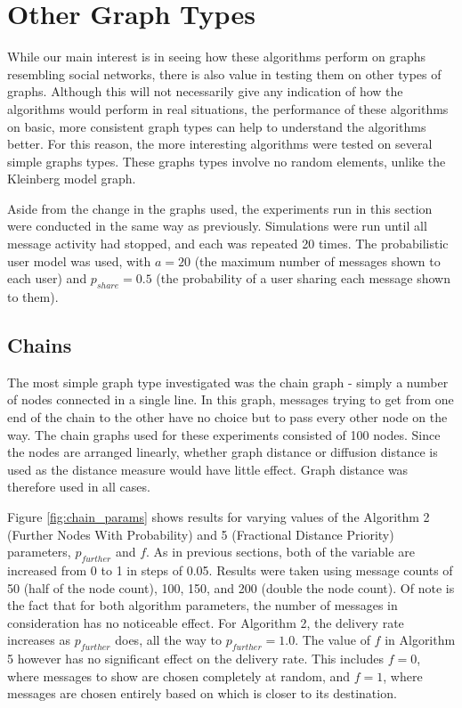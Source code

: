 \documentclass[bsc,frontabs,twoside,singlespacing,parskip,deptreport]{infthesis}     %
\begin{document}
\section{Other Graph Types} \label{sec:other_graph_types}

While our main interest is in seeing how these algorithms perform on graphs resembling social networks, there is also value in testing them on other types of graphs. Although this will not necessarily give any indication of how the algorithms would perform in real situations, the performance of these algorithms on basic, more consistent graph types can help to understand the algorithms better. For this reason, the more interesting algorithms were tested on several simple graphs types. These graphs types involve no random elements, unlike the Kleinberg model graph.

Aside from the change in the graphs used, the experiments run in this section were conducted in the same way as previously. Simulations were run until all message activity had stopped, and each was repeated 20 times. The probabilistic user model was used, with $a=20$ (the maximum number of messages shown to each user) and $p_{share}=0.5$ (the probability of a user sharing each message shown to them).

\subsection{Chains}
The most simple graph type investigated was the chain graph - simply a number of nodes connected in a single line. In this graph, messages trying to get from one end of the chain to the other have no choice but to pass every other node on the way. The chain graphs used for these experiments consisted of 100 nodes. Since the nodes are arranged linearly, whether graph distance or diffusion distance is used as the distance measure would have little effect. Graph distance was therefore used in all cases.

Figure \ref{fig:chain_params} shows results for varying values of the Algorithm 2 (Further Nodes With Probability) and 5 (Fractional Distance Priority) parameters, $p_{further}$ and $f$. As in previous sections, both of the variable are increased from 0 to 1 in steps of 0.05. Results were taken using message counts of 50 (half of the node count), 100, 150, and 200 (double the node count). Of note is the fact that for both algorithm parameters, the number of messages in consideration has no noticeable effect. For Algorithm 2, the delivery rate increases as $p_{further}$ does, all the way to $p_{further}=1.0$. The value of $f$ in Algorithm 5 however has no significant effect on the delivery rate. This includes $f=0$, where messages to show are chosen completely at random, and $f=1$, where messages are chosen entirely based on which is closer to its destination.
\end{document}
